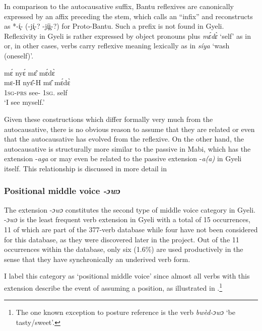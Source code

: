 In comparison to the autocausative suffix, Bantu reflexives are canonically expressed by an affix preceding the stem, which \citet[109]{meeussen67} calls an ``infix'' and  reconstructs as *-\c{í}-  (-j\c{í}-? -j\c{í}\c{i}-?)  for Proto-Bantu. Such a prefix is not found in Gyeli. Reflexivity in Gyeli is rather expressed by object pronouns plus {\itshape mɛ́dɛ̀} `self' as in  or, in other cases, verbs carry reflexive meaning lexically as in {\itshape síya} `wash (oneself)'. 


\ea \label{reflex}
  \glll     mɛ́ nyɛ́ mɛ̂ mɛ́dɛ̀ \\
	mɛ-H nyɛ̂-H mɛ̂ mɛ́dɛ̀ \\
              1\textsc{sg}-\textsc{prs} see-{\R} 1\textsc{sg}.{\OBJ} self   \\
    \trans `I see myself.'
\z

Given these constructions which differ formally very much from the autocausative, there is no obvious reason to assume that they are related or even that the autocausative has evolved from the reflexive. On the other hand, the autocausative is structurally more similar to the passive in Mabi, which has the extension -{\itshape aga} or may even be related to the passive extension -{\itshape a(a)} in Gyeli itself. This relationship is discussed in more detail in 


\subsubsection{Positional middle voice \textit{-ɔwɔ}}
\label{sec:PosVerbs}

The extension -{\itshape ɔwɔ} constitutes the second type of middle voice category in Gyeli. -{\itshape ɔwɔ} is the least frequent verb extension in Gyeli with a total of 15 occurrences, 11 of which are part of the 377-verb database while four have not been considered for this database, as they were discovered later in the project. Out of the 11 occurrences within the database, only six (1.6\%) are used productively in the sense that they have synchronically an underived verb form.  

I label this category as ‘positional middle voice’ since almost all verbs with this extension describe the event of assuming a position, as illustrated in .\footnote{The one known exception to posture reference is the verb {\itshape bwèd-ɔwɔ} `be tasty/sweet'.}


